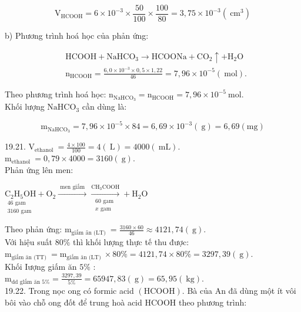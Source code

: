 \documentclass[10pt]{article}
\begin{document}
$$
\mathrm{V}_{\mathrm{HCOOH}}=6 \times 10^{-3} \times \frac{50}{100} \times \frac{100}{80}=3,75 \times 10^{-3}\left(\mathrm{~cm}^{3}\right)
$$

b) Phương trình hoá học của phản ứng:

$$
\begin{aligned}
& \mathrm{HCOOH}+\mathrm{NaHCO}_{3} \rightarrow \mathrm{HCOONa}+\mathrm{CO}_{2} \uparrow+\mathrm{H}_{2} \mathrm{O} \\
& \mathrm{n}_{\mathrm{HCOOH}}=\frac{6,0 \times 10^{-3} \times 0,5 \times 1,22}{46}=7,96 \times 10^{-5}(\mathrm{~mol}) .
\end{aligned}
$$

Theo phương trình hoá học: $\mathrm{n}_{\mathrm{NaHCO}_{3}}=\mathrm{n}_{\mathrm{HCOOH}}=7,96 \times 10^{-5} \mathrm{~mol}$.\\
Khối lượng $\mathrm{NaHCO}_{3}$ cần dùng là:

$$
\mathrm{m}_{\mathrm{NaHCO}_{3}}=7,96 \times 10^{-5} \times 84=6,69 \times 10^{-3}(\mathrm{~g})=6,69(\mathrm{mg})
$$

19.21. $\mathrm{V}_{\text {ethanol }}=\frac{4 \times 100}{100}=4(\mathrm{~L})=4000(\mathrm{~mL})$.\\
$\mathrm{m}_{\text {ethanol }}=0,79 \times 4000=3160(\mathrm{~g})$.\\
Phản ứng lên men:

$\underset{\substack{46 \text { gam } \\ 3160 \text { gam }}}{\mathrm{C}_{2} \mathrm{H}_{5} \mathrm{OH}}+\mathrm{O}_{2} \xrightarrow{\text { men giấm }} \xrightarrow[\substack{60 \text { gam } \\ x \text { gam }}]{\mathrm{CH}_{3} \mathrm{COOH}}+\mathrm{H}_{2} \mathrm{O}$

Theo phản ứng: $\mathrm{m}_{\text {giấm ãn (LT) }}=\frac{3160 \times 60}{46} \approx 4121,74(\mathrm{~g})$.\\
Với hiệu suất $80 \%$ thì khối lượng thực tế thu được:\\
$\mathrm{m}_{\text {giấm ăn (TT) }}=\mathrm{m}_{\text {giấm ăn (LT) }} \times 80 \%=4121,74 \times 80 \%=3297,39(\mathrm{~g})$.\\
Khối Iượng giấm ăn $5 \%$ :\\
$\mathrm{m}_{\text {dd glấm ăn } 5 \%}=\frac{3297,39}{5 \%}=65947,83(\mathrm{~g})=65,95(\mathrm{~kg})$.\\
19.22. Trong nọc ong có formic acid $(\mathrm{HCOOH})$. Bà của An đã dùng một ít vôi bôi vào chỗ ong đốt để trung hoà acid HCOOH theo phương trình:
\end{document}
